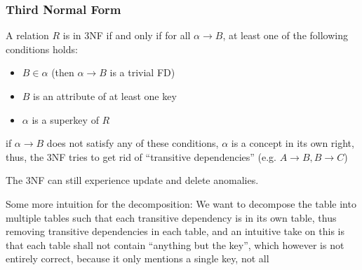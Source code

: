 \subsubsection{Third Normal Form}
A relation $R$ is in 3NF if and only if for all $\alpha \rightarrow B$, at least one of the following conditions holds:
\begin{itemize}
    \item $B \in \alpha$ (then $\alpha \rightarrow B$ is a trivial FD)
    \item $B$ is an attribute of at least one key
    \item $\alpha$ is a \gls{superkey} of $R$
\end{itemize}
\inlineintuition if $\alpha \rightarrow B$ does not satisfy any of these conditions, $\alpha$ is a concept in its own right,
thus, the 3NF tries to get rid of ``transitive dependencies'' (e.g. $A \rightarrow B, B \rightarrow C$)

The 3NF can still experience update and delete anomalies.

\inlineintuition Some more intuition for the decomposition: We want to decompose the table into multiple tables such that each transitive dependency
is in its own table, thus removing transitive dependencies in each table, and an intuitive take on this is that each table shall not contain ``anything but the key'',
which however is not entirely correct, because it only mentions a single key, not all
